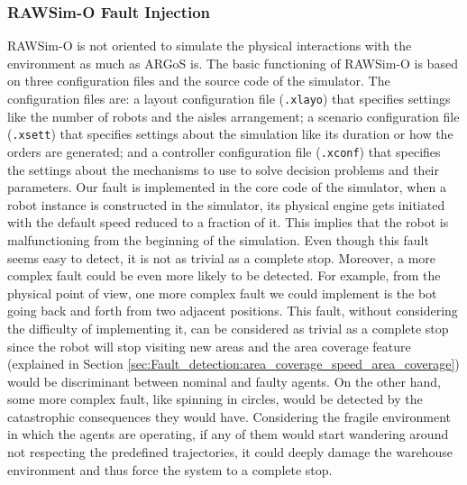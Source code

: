 \documentclass[../../Thesis.tex]{subfiles}
\begin{document}
			\subsubsection{RAWSim-O Fault Injection}
				RAWSim-O is not oriented to simulate the physical interactions with the environment as much as ARGoS is. The basic functioning of RAWSim-O is based on three configuration files and the source code of the simulator. The configuration files are: a layout configuration file (\verb|.xlayo|) that specifies settings like the number of robots and the aisles arrangement; a scenario configuration file (\verb|.xsett|) that specifies settings about the simulation like its duration or how the orders are generated; and a controller configuration file (\verb|.xconf|) that specifies the settings about the mechanisms to use to solve decision problems and their parameters. Our fault is implemented in the core code of the simulator, when a robot instance is constructed in the simulator, its physical engine gets initiated with the default speed reduced to a fraction of it. This implies that the robot is malfunctioning from the beginning of the simulation. Even though this fault seems easy to detect, it is not as trivial as a complete stop. Moreover, a more complex fault could be even more likely to be detected. For example, from the physical point of view, one more complex fault we could implement is the bot going back and forth from two adjacent positions. This fault, without considering the difficulty of implementing it, can be considered as trivial as a complete stop since the robot will stop visiting new areas and the area coverage feature (explained in Section \ref{sec:Fault_detection:area_coverage_speed_area_coverage}) would be discriminant between nominal and faulty agents. On the other hand, some more complex fault, like spinning in circles, would be detected by the catastrophic consequences they would have. Considering the fragile environment in which the agents are operating, if any of them would start wandering around not respecting the predefined trajectories, it could deeply damage the warehouse environment and thus force the system to a complete stop.
		
			
\end{document}
